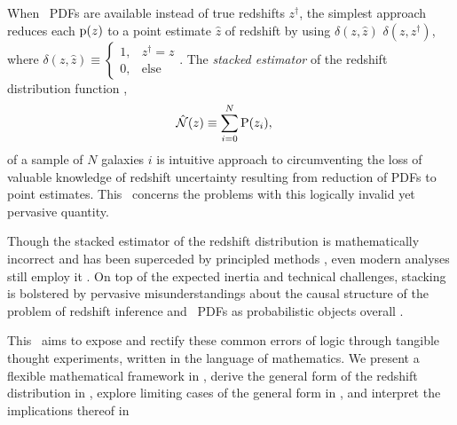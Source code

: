 When \pz\ PDFs are available instead of true redshifts $z^{\dagger}$, the simplest approach reduces each $\mathrm{p}(z)$ to a point estimate $\hat{z}$ of redshift by using $\delta(z, \hat{z})$  $\delta(z, z^{\dagger})$, where $\delta(z, \hat{z}) \equiv 
\begin{cases}
1, & z^{\dagger} = z\\
0, & \mathrm{else}
\end{cases}$.
The \textit{stacked estimator} of the redshift distribution function \citep{lima_estimating_2008}, 
    \begin{align}
    \eqlabel{eqn:stack}
    \hat{\mathcal{N}}(z) &\equiv \sum_{i = 0}^{N} \dwh{\mathrm{P}(z_{i})} ,
    \end{align}
of a sample of $N$ galaxies $i$ is  intuitive approach to circumventing the loss of valuable knowledge of redshift uncertainty resulting from reduction of \pz PDFs to point estimates.
This \ concerns the problems with this logically invalid yet pervasive quantity.

Though the stacked estimator  of the redshift distribution is mathematically incorrect \citep{hogg_data_2012} and has been superceded by principled methods \citep{leistedt_hierarchical_2016, malz_cosmological_2019}, even modern analyses still employ it \citep{sheldon_photometric_2012, hoyle_dark_2018}.
On top of the expected inertia and technical challenges, stacking is bolstered by pervasive misunderstandings about the causal structure of the problem of redshift inference and \pz\ PDFs as probabilistic objects overall \citep{gruen_combining_2017, jarvis_open_2018, malz_re:_2018}.

This \ aims to expose and rectify these common errors of logic through tangible thought experiments, written in the language of mathematics.
We present a flexible mathematical framework in , derive the general form of the redshift distribution in , explore limiting cases of the general form in , and interpret the implications thereof in 

